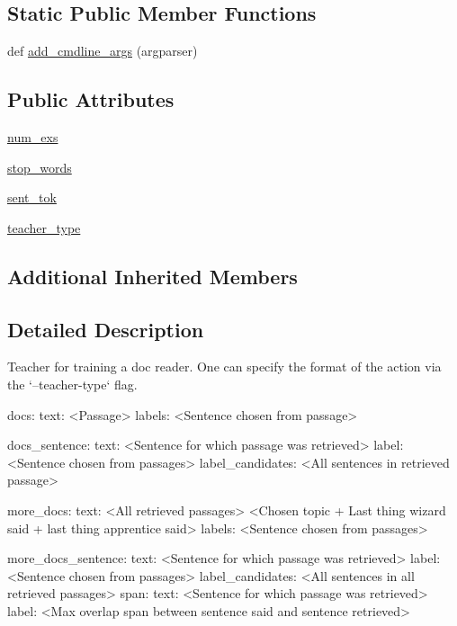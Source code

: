 \subsection*{Static Public Member Functions}
\begin{DoxyCompactItemize}
\item 
def \hyperlink{classparlai_1_1tasks_1_1wizard__of__wikipedia_1_1agents_1_1DocreaderTeacher_a4c307fc0411f560ff9ccf0bdd8a794ef}{add\+\_\+cmdline\+\_\+args} (argparser)
\end{DoxyCompactItemize}
\subsection*{Public Attributes}
\begin{DoxyCompactItemize}
\item 
\hyperlink{classparlai_1_1tasks_1_1wizard__of__wikipedia_1_1agents_1_1DocreaderTeacher_a5c7fd889baaca59e8d1bcb105084cc4a}{num\+\_\+exs}
\item 
\hyperlink{classparlai_1_1tasks_1_1wizard__of__wikipedia_1_1agents_1_1DocreaderTeacher_a3f6ba852ce8621883a21c1f4fadb9814}{stop\+\_\+words}
\item 
\hyperlink{classparlai_1_1tasks_1_1wizard__of__wikipedia_1_1agents_1_1DocreaderTeacher_adfa0a51acde58e5cbfa9553b06594852}{sent\+\_\+tok}
\item 
\hyperlink{classparlai_1_1tasks_1_1wizard__of__wikipedia_1_1agents_1_1DocreaderTeacher_a4582a196ca5c413be227f84c48afb4b5}{teacher\+\_\+type}
\end{DoxyCompactItemize}
\subsection*{Additional Inherited Members}


\subsection{Detailed Description}
\begin{DoxyVerb}Teacher for training a doc reader. One can specify the format of the
action via the `--teacher-type` flag.

docs:
    {
        text: <Passage> 
        labels: <Sentence chosen from passage>
    }

docs_sentence:
    {
        text: <Sentence for which passage was retrieved>
        label: <Sentence chosen from passages>
        label_candidates: <All sentences in retrieved passage>
    }

more_docs:
    {
        text: <All retrieved passages> \n
              <Chosen topic + Last thing wizard said + last thing apprentice said>
        labels: <Sentence chosen from passages>
    }

more_docs_sentence:
    {
        text: <Sentence for which passage was retrieved>
        label: <Sentence chosen from passages>
        label_candidates: <All sentences in all retrieved passages>
    }
span:
    {
        text: <Sentence for which passage was retrieved>
        label: <Max overlap span between sentence said and sentence retrieved>
    }\end{DoxyVerb}
 

